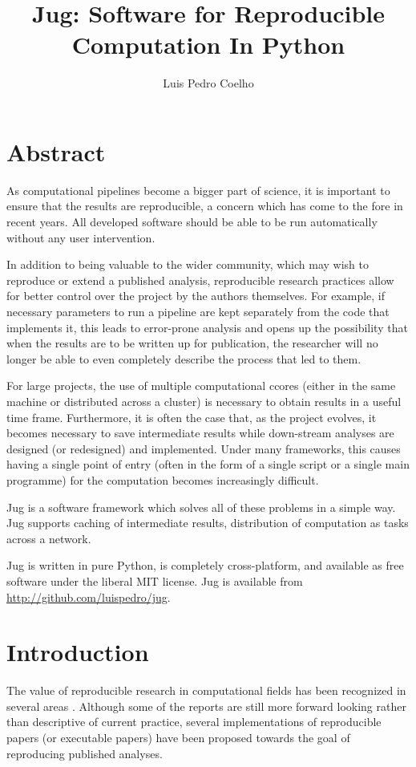 \documentclass{article}
\title{Jug: Software for Reproducible Computation In Python}
\author{Luis Pedro Coelho}
\begin{document}
\maketitle

\section*{Abstract}
As computational pipelines become a bigger part of science, it is important to
ensure that the results are reproducible, a concern which has come to the fore
in recent years. All developed software should be able to be run automatically
without any user intervention.

In addition to being valuable to the wider community, which may wish to
reproduce or extend a published analysis, reproducible research practices allow
for better control over the project by the authors themselves. For example, if
necessary parameters to run a pipeline are kept separately from the code that
implements it, this leads to error-prone analysis and opens up the possibility
that when the results are to be written up for publication, the researcher will
no longer be able to even completely describe the process that led to them.

For large projects, the use of multiple computational ccores (either in the
same machine or distributed across a cluster) is necessary to obtain results in
a useful time frame. Furthermore, it is often the case that, as the project
evolves, it becomes necessary to save intermediate results while down-stream
analyses are designed (or redesigned) and implemented. Under many frameworks,
this causes having a single point of entry (often in the form of a single
script or a single main programme) for the computation becomes increasingly
difficult.

Jug is a software framework which solves all of these problems in a simple way.
Jug supports caching of intermediate results, distribution of computation as
tasks across a network.

Jug is written in pure Python, is completely cross-platform, and available as
free software under the liberal MIT license. Jug is available from
\url{http://github.com/luispedro/jug}.
\bigskip
\bigskip

\section{Introduction}
The value of reproducible research in computational fields has been recognized
in several areas \citep{Vandewalle2009,Nordlie2009}. Although some of the
reports are still more forward looking rather than descriptive of current
practice, several implementations of reproducible papers (or executable papers)
have been proposed towards the goal of reproducing published analyses.
\end{document}
